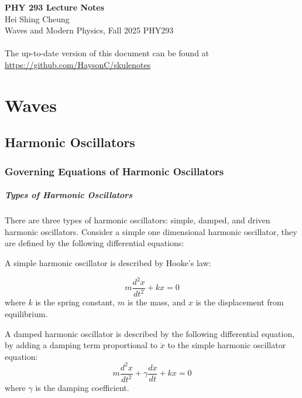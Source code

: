 \documentclass[11pt]{report}
\begin{document}
\thispagestyle{empty}
{\LARGE \bf PHY 293 Lecture Notes}\\
{\large Hei Shing Cheung}\\
Waves and Modern Physics, Fall 2025 \hfill PHY293\\
\\
The up-to-date version of this document can be found at \url{https://github.com/HaysonC/skulenotes}\\

\chapter{Waves}
\section{Harmonic Oscillators}

\subsection{Governing Equations of Harmonic Oscillators}

\paragraph{Types of Harmonic Oscillators} There are three types of harmonic oscillators: simple, damped, and driven harmonic oscillators. Consider a simple one dimensional harmonic oscillator, they are defined by the following differential equations:

\begin{definition}
    A simple harmonic oscillator is described by Hooke's law:

    \begin{equation}
        m \frac{d^2 x}{dt^2} + kx = 0
    \end{equation}
    where \( k \) is the spring constant, \( m \) is the mass, and \( x \) is the displacement from equilibrium.
\end{definition}

\begin{definition}
    A damped harmonic oscillator is described by the following differential equation, by adding a damping term proportional to $\dot{x}$ to the simple harmonic oscillator equation:
    \begin{equation}
        m \frac{d^2 x}{dt^2} + \gamma \frac{dx}{dt} + kx = 0   
    \end{equation}
    where \( \gamma \) is the damping coefficient.
\end{definition}
\end{document}
